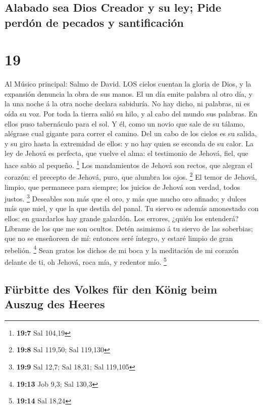 \hypertarget{alabado-sea-dios-creador-y-su-ley-pide-perduxf3n-de-pecados-y-santificaciuxf3n}{%
\subsection{Alabado sea Dios Creador y su ley; Pide perdón de pecados y
santificación}\label{alabado-sea-dios-creador-y-su-ley-pide-perduxf3n-de-pecados-y-santificaciuxf3n}}

\hypertarget{section-18}{%
\section{19}\label{section-18}}

 Al Músico principal: Salmo de David. LOS cielos cuentan la
gloria de Dios, y la expansión denuncia la obra de sus manos.
 El un día emite palabra al otro día, y la una noche á la
otra noche declara sabiduría.  No hay dicho, ni palabras, ni
es oída su voz.  Por toda la tierra salió su hilo, y al cabo
del mundo sus palabras. En ellos puso tabernáculo para el sol.
 Y él, como un novio que sale de su tálamo, alégrase cual
gigante para correr el camino.  Del un cabo de los cielos es
su salida, y su giro hasta la extremidad de ellos: y no hay quien se
esconda de su calor.  La ley de Jehová es perfecta, que
vuelve el alma: el testimonio de Jehová, fiel, que hace sabio al
pequeño. \footnote{\textbf{19:7} Sal 104,19}  Los
mandamientos de Jehová son rectos, que alegran el corazón: el precepto
de Jehová, puro, que alumbra los ojos. \footnote{\textbf{19:8} Sal
  119,50; Sal 119,130}  El temor de Jehová, limpio, que
permanece para siempre; los juicios de Jehová son verdad, todos justos.
\footnote{\textbf{19:9} Sal 12,7; Sal 18,31; Sal 119,105} 
Deseables son más que el oro, y más que mucho oro afinado; y dulces más
que miel, y que la que destila del panal.  Tu siervo es
además amonestado con ellos: en guardarlos hay grande galardón.
 Los errores, ¿quién los entenderá? Líbrame de los que me
son ocultos.  Detén asimismo á tu siervo de las soberbias;
que no se enseñoreen de mí: entonces seré íntegro, y estaré limpio de
gran rebelión. \footnote{\textbf{19:13} Job 9,3; Sal 130,3}
 Sean gratos los dichos de mi boca y la meditación de mi
corazón delante de ti, oh Jehová, roca mía, y redentor mío. \footnote{\textbf{19:14}
  Sal 18,24}

\hypertarget{fuxfcrbitte-des-volkes-fuxfcr-den-kuxf6nig-beim-auszug-des-heeres}{%
\subsection{Fürbitte des Volkes für den König beim Auszug des
Heeres}\label{fuxfcrbitte-des-volkes-fuxfcr-den-kuxf6nig-beim-auszug-des-heeres}}

